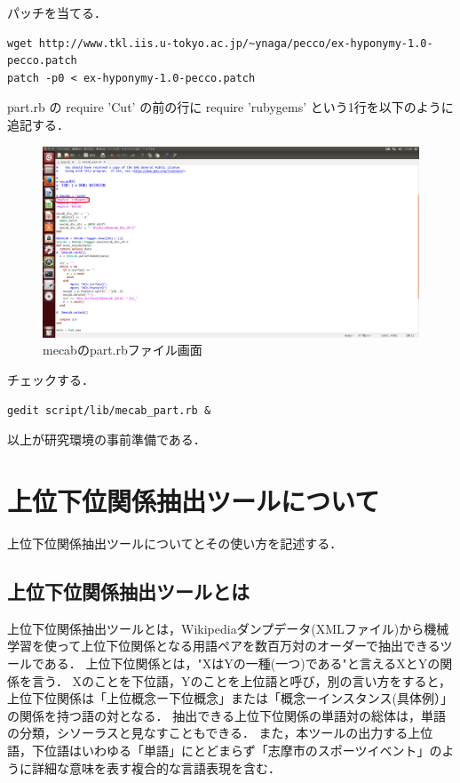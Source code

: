 パッチを当てる．
{\small
\begin{verbatim}
wget http://www.tkl.iis.u-tokyo.ac.jp/~ynaga/pecco/ex-hyponymy-1.0-pecco.patch
patch -p0 < ex-hyponymy-1.0-pecco.patch
\end{verbatim}}

part.rb の require 'Cut' の前の行に require 'rubygems' という1行を以下のように追記する．
\begin{figure}[hb]
\centering
\includegraphics[width=15cm]{require}
\caption{mecabのpart.rbファイル画面}\label{require}
\end{figure}

チェックする．
{\small
\begin{verbatim}
gedit script/lib/mecab_part.rb &
\end{verbatim}}

以上が研究環境の事前準備である．

\section{上位下位関係抽出ツールについて}
上位下位関係抽出ツールについてとその使い方を記述する．

\subsection{上位下位関係抽出ツールとは}
上位下位関係抽出ツールとは，Wikipediaダンプデータ(XMLファイル)から機械学習を使って上位下位関係となる用語ペアを数百万対のオーダーで抽出できるツールである． 上位下位関係とは，"XはYの一種(一つ)である"と言えるXとYの関係を言う． Xのことを下位語，Yのことを上位語と呼び，別の言い方をすると，上位下位関係は「上位概念ー下位概念」または「概念ーインスタンス(具体例）」の関係を持つ語の対となる． 抽出できる上位下位関係の単語対の総体は，単語の分類，シソーラスと見なすこともできる． 
\clearpage
また，本ツールの出力する上位語，下位語はいわゆる「単語」にとどまらず「志摩市のスポーツイベント」のように詳細な意味を表す複合的な言語表現を含む．

